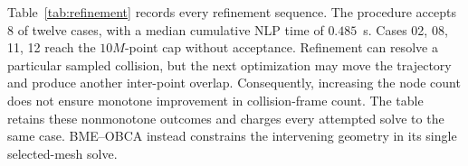 Table~\ref{tab:refinement} records every refinement sequence. The procedure accepts 8 of twelve cases, with a median cumulative NLP time of $0.485$~s. Cases 02, 08, 11, 12 reach the $10M$-point cap without acceptance. Refinement can resolve a particular sampled collision, but the next optimization may move the trajectory and produce another inter-point overlap. Consequently, increasing the node count does not ensure monotone improvement in collision-frame count. The table retains these nonmonotone outcomes and charges every attempted solve to the same case. BME--OBCA instead constrains the intervening geometry in its single selected-mesh solve.
